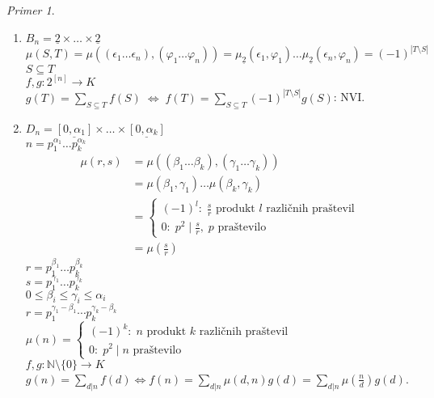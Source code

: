 \documentclass[a4paper, 12pt]{book}
\theoremstyle{definition}
\theoremstyle{remark}
\newtheorem*{ex}{Primer}
\newcommand{\N}{\mathbb{N}}
\begin{document}
\begin{ex} \text{}
  \begin{enumerate}[label=(\arabic*)]
    \item $B_n = \underline{2} \times \dots \times \underline{2}$ \\
      $\mu(S, T) = \mu((\epsilon_1 \dots \epsilon_n), (\varphi_1 \dots \varphi_n))
        = \mu_{\underline{2}}(\epsilon_1, \varphi_1) \dots \mu_{\underline{2}}(\epsilon_n, \varphi_n)
        = (-1)^{|T \setminus S|}$ \\
      $S \subseteq T$ \\
      $f, g: 2^{[n]} \to K$ \\
      $g(T) = \sum_{S \subseteq T} f(S) \; \iff \;
      f(T) = \sum_{S \subseteq T} (-1)^{|T \setminus S|} g(S)$: NVI.
    \item $D_n = \underline{[0, \alpha_1]} \times \dots \times \underline{[0, \alpha_k]}$ \\
      $n = p_1^{\alpha_1} \dots p_k^{\alpha_k}$
      \begin{align*}
        \mu(r,s) &= \mu((\beta_1 \dots \beta_k), (\gamma_1 \dots \gamma_k)) \\
        &= \mu(\beta_1, \gamma_1) \dots \mu(\beta_k, \gamma_k) \\
        &= \begin{cases}
          (-1)^l: \; \frac{s}{r} \text{ produkt $l$ različnih praštevil} \\
          0: \; p^2 \mid \frac{s}{r}, \; p \text{ praštevilo}
        \end{cases} \\
        &= \mu\left(\frac{s}{r}\right)
      \end{align*}
      $r = p_1^{\beta_1} \dots p_k^{\beta_k}$ \\
      $s = p_1^{\gamma_1} \dots p_k^{\gamma_k}$ \\
      $0 \leq \beta_i \leq \gamma_i \leq \alpha_i$ \\
      $r = p_1^{\gamma_1 - \beta_1} \cdots p_k^{\gamma_k - \beta_k}$ \\
      $\mu(n) = \begin{cases}
        (-1)^k: \; n \text{ produkt $k$ različnih praštevil} \\
        0: \; p^2 \mid n \text{ praštevilo}
      \end{cases}$ \\
      $f, g: \N \setminus \{0\} \to K$ \\
      $g(n) = \sum_{d | n} f(d) \iff
      f(n) = \sum_{d | n} \mu(d,n) g(d) = \sum_{d | n} \mu\left(\frac{n}{d}\right) g(d)$.
  \end{enumerate}
\end{ex}
\end{document}
